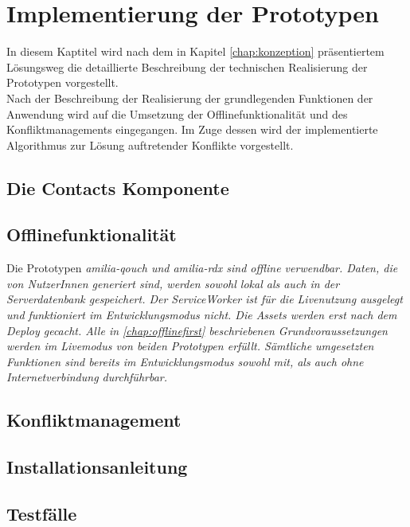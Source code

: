\chapter{\label{chap:implementierung}Implementierung der Prototypen}
In diesem Kaptitel wird nach dem in Kapitel \ref{chap:konzeption} präsentiertem Lösungsweg die detaillierte Beschreibung der technischen Realisierung der Prototypen vorgestellt.\\
Nach der Beschreibung der Realisierung der grundlegenden Funktionen der Anwendung wird auf die Umsetzung der Offlinefunktionalität und des Konfliktmanagements eingegangen.
Im Zuge dessen wird der implementierte Algorithmus zur Lösung auftretender Konflikte vorgestellt.
%
%
%
\section{Die Contacts Komponente}

%
%
%
\section{Offlinefunktionalität}
Die Prototypen \it{amilia-qouch} und \it{amilia-rdx} sind offline verwendbar.
Daten, die von NutzerInnen generiert sind, werden sowohl lokal als auch in der Serverdatenbank gespeichert.
Der ServiceWorker ist für die Livenutzung ausgelegt und funktioniert im Entwicklungsmodus nicht. Die \gls{Assets} werden erst nach dem Deploy gecacht.
Alle in \autoref{chap:offlinefirst} beschriebenen Grundvoraussetzungen werden im Livemodus von beiden Prototypen erfüllt.
Sämtliche umgesetzten Funktionen sind bereits im Entwicklungsmodus sowohl mit, als auch ohne Internetverbindung durchführbar.
%

%
%
%
\section{\label{chap:konfliktmanagement}Konfliktmanagement}

%
%
\section{Installationsanleitung}


%
%
\section{\label{chap:impl:test}Testfälle}
